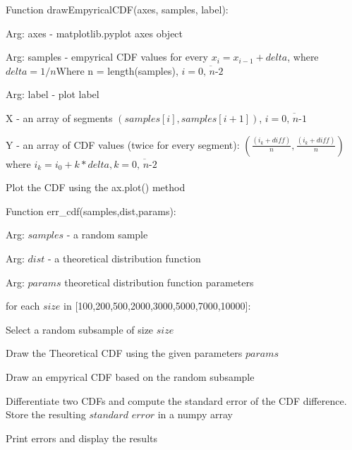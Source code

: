 \documentclass[11pt]{article}
\begin{document}
    Function drawEmpyricalCDF(axes, samples, label):

Arg: axes - matplotlib.pyplot axes object

Arg: samples - empyrical CDF values for every \(x_i = x_{i-1}+delta\),
where \(delta = 1/n\)Where n = length(samples),
\(i=\overline{\textit{0, n-2}}\)

Arg: label - plot label

X - an array of segments \((samples[i],samples[i+1])\),
\(i=\overline{\textit{0, n-1}}\)

Y - an array of CDF values (twice for every segment):
\((\frac{(i_k+\textit{diff})}{n},\frac{(i_k+\textit{diff})}{n})\) where
\(i_k=i_0+k*\textit{delta}, k=\overline{\textit{0, n-2}}\)

Plot the CDF using the ax.plot() method

Function err\_cdf(samples,dist,params):

Arg: \(\textit{samples}\) - a random sample

Arg: \(\textit{dist}\) - a theoretical distribution function

Arg: \(\textit{params}\) theoretical distribution function parameters

for each \(size\) in {[}100,200,500,2000,3000,5000,7000,10000{]}:

Select a random subsample of size \(size\)

Draw the Theoretical CDF using the given parameters \(params\)

Draw an empyrical CDF based on the random subsample

Differentiate two CDFs and compute the standard error of the CDF
difference. Store the resulting \(\textit{standard error}\) in a numpy
array

Print errors and display the results
\end{document}
